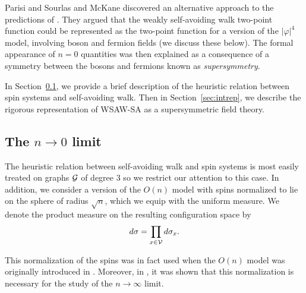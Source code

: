 Parisi and Sourlas \cite{PS80} and McKane \cite{McKa80} discovered
an alternative approach to the predictions of . They argued that the weakly
self-avoiding walk two-point function could be represented as the two-point function
for a version of the $|\varphi|^4$ model, involving boson and
fermion fields (we discuss these below). The formal appearance of $n = 0$ quantities
was then explained as a consequence of a symmetry between the bosons and fermions known
as \emph{supersymmetry}.

In Section~\ref{sec:ntozero}, we provide a brief description of the heuristic
relation between spin systems and self-avoiding walk. Then in Section~\ref{sec:intrep},
we describe the rigorous representation of WSAW-SA as a supersymmetric field
theory.


\subsection{The \texorpdfstring{$n\to0$}{n approaches 0} limit}
\label{sec:ntozero}

The heuristic relation between self-avoiding walk and spin systems is most easily
treated on  graphs $\mathcal{G}$ of degree $3$
so we restrict our attention to this case. In
addition, we consider a version of the $O(n)$ model with spins normalized to
lie on the sphere of radius $\sqrt n$, which we equip with the uniform measure.
We denote the product measure on the resulting configuration space by
\begin{equation}
d\sigma = \prod_{x\in\mathcal{V}} d\sigma_x.
\end{equation}

\begin{rk}
This normalization of the spins was in fact used when the $O(n)$ model was originally
introduced in \cite{Stanley68}. Moreover, in \cite{KT71}, it was shown that this
normalization is necessary for the study of the $n\to\infty$ limit.
\end{rk}

